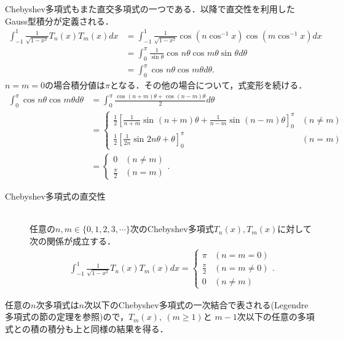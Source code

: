 \documentclass[a4j,papersize,disablejfam,slide,14pt]{jsarticle}
\def\sin#1#2{\operatorname{sin}^{#2} #1} %
\def\cos#1#2{\operatorname{cos}^{#2} #1} %
\begin{document}
    {\rm Chebyshev}多項式もまた直交多項式の一つである．以降で直交性を利用した{\rm Gauss}型積分が定義される．
    \begin{align}
    	\int_{-1}^{1} \frac{1}{\sqrt{1-x^2}}T_n(x)T_m(x)dx &= \int_{-1}^{1} \frac{1}{\sqrt{1-x^2}} \cos{(n\cos{x}{-1})}{}\cos{(m\cos{x}{-1})}{} dx \\
        &= \int_{0}^{\pi} \frac{1}{\sin{\theta}{}} \cos{n\theta}{}\cos{m\theta}{} \sin{\theta}{} d\theta \\
        &= \int_{0}^{\pi} \cos{n\theta}{}\cos{m\theta}{} d\theta.
    \end{align}
    $n=m=0$の場合積分値は$\pi$となる．その他の場合について，式変形を続ける．
    \begin{align}
    	\int_{0}^{\pi} \cos{n\theta}{}\cos{m\theta}{} d\theta &= \int_{0}^{\pi} \frac{\cos{(n+m)\theta}{} + \cos{(n-m)\theta}{}}{2} d\theta \\
        &= \begin{cases}
        	\frac{1}{2} \left[ \frac{1}{n+m} \sin{(n+m)\theta}{} + \frac{1}{n-m} \sin{(n-m)\theta}{} \right]_{0}^{\pi} & (n \neq m) \\
            \frac{1}{2} \left[ \frac{1}{2n} \sin{2n\theta}{} + \theta \right]_{0}^{\pi} & (n=m)
        	\end{cases} \\
        &= \begin{cases}
        	0 & (n \neq m) \\
            \frac{\pi}{2} & (n=m)
            \end{cases}.
    \end{align}
    
    \begin{screen}
    	\begin{description}
        	\item[{\rm Chebyshev}多項式の直交性]\mbox{}\\
            任意の$n,m \in \{0,1,2,3,\cdots\}$次の{\rm Chebyshev}多項式$T_n(x), T_m(x)$に対して次の関係が成立する．
            \begin{align}
            	\int_{-1}^{1} \frac{1}{\sqrt{1-x^2}}T_n(x)T_m(x)dx = 
                \begin{cases}
                	\pi & (n=m=0) \\
                    \frac{\pi}{2} & (n = m \neq 0) \\
                    0 & (n \neq m)
                \end{cases}.
            \end{align}
        \end{description}
    \end{screen}
    任意の$n$次多項式は$n$次以下の{\rm Chebyshev}多項式の一次結合で表される({\rm Legendre}多項式の節の定理を参照)ので，$T_m(x),\ (m \geq 1)$と
    $m-1$次以下の任意の多項式との積の積分も上と同様の結果を得る．
\end{document}
